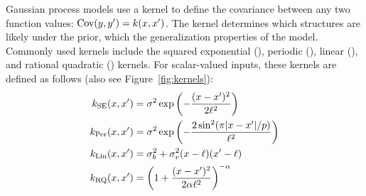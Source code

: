 \documentclass[twoside]{article}
\begin{document}
Gaussian process models use a kernel to define the covariance between any two function values: ${\textrm{Cov}(y, y') = k(x,x')}$.
The kernel determines which structures are likely under the \gp{} prior, which  the generalization properties of the model.
%
%
Commonly used kernels include the squared exponential (\kSE), periodic (\kPer), linear (\kLin), and rational quadratic (\kRQ) kernels. 
For scalar-valued inputs, these kernels are defined as follows (also see Figure~\ref{fig:kernels}):
\begin{align}
k_\textrm{SE}(x, x') &= \sigma^2\exp\left(-\frac{(x - x')^2}{2\ell^2}\right) \\
k_\textrm{Per}(x, x') &= \sigma^2\exp\left(-\frac{2\sin^2(\pi|x - x'|/p)}{\ell^2}\right) \\
k_\textrm{Lin}(x, x') &= \sigma_b^2 + \sigma_v^2(x - \ell)(x' - \ell) \\
k_\textrm{RQ}(x, x') &= \left( 1 + \frac{(x - x')^2}{2 \alpha \ell^2} \right)^{-\alpha}
\end{align}

\end{document}
